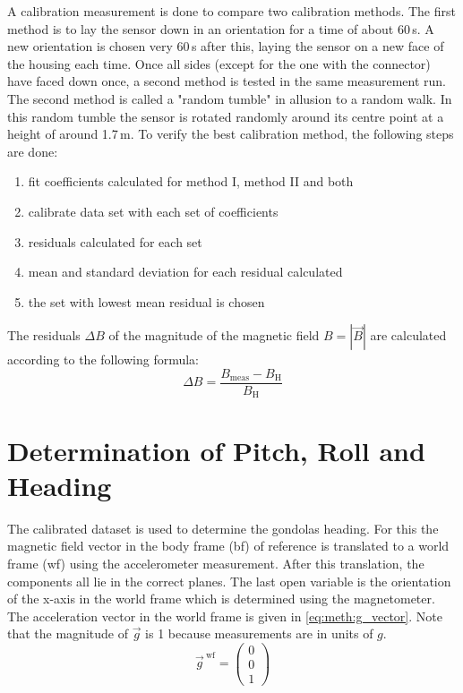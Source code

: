 A calibration measurement is done to compare two calibration methods. The first method is to lay the sensor down in an orientation for a time of about 60\,s. A new orientation is chosen very 60\,s after this, laying the sensor on a new face of the housing each time. Once all sides (except for the one with the connector) have faced down once, a second method is tested in the same measurement run. The second method is called a "random tumble" in allusion to a random walk. In this random tumble the sensor is rotated randomly around its centre point at a height of around 1.7\,m. To verify the best calibration method, the following steps are done:
\begin{enumerate}
    \item fit coefficients calculated for method I, method II and both
    \item calibrate data set with each set of coefficients
    \item residuals calculated for each set
    \item mean and standard deviation for each residual calculated
    \item the set with lowest mean residual is chosen
\end{enumerate}
The residuals $\Delta B$ of the magnitude of the magnetic field $B=|\vec{B}|$ are calculated according to the following formula:
\begin{equation}
    \Delta B=\frac{B_{\mathrm{meas}}-B_{\mathrm{H}}}{B_{\mathrm{H}}}
    \label{eq:residuals}
\end{equation}



\section{Determination of Pitch, Roll and Heading \label{sec:meth:determination_heading}}
The calibrated dataset is used to determine the gondolas heading. For this the magnetic field vector in the body frame (bf) of reference is translated to a world frame (wf) using the accelerometer measurement. After this translation, the components all lie in the correct planes. The last open variable is the orientation of the x-axis in the world frame which is determined using the magnetometer. The acceleration vector in the world frame is given in \eqref{eq:meth:g_vector}. Note that the magnitude of $\vec{g}$ is 1 because measurements are in units of $g$.
\begin{equation}
    \vec{g}^{\ \mathrm{wf}}=\begin{pmatrix} 0 \\ 0 \\ 1 \end{pmatrix} \label{eq:meth:g_vector}
\end{equation}

